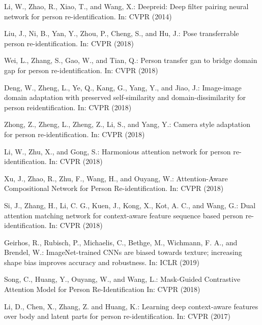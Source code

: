 \documentclass[10pt,twocolumn,letterpaper]{article}
\begin{document}
\begin{thebibliography}{8}

Li, W., Zhao, R., Xiao, T., and Wang, X.:
\newblock Deepreid: Deep filter pairing neural network for person re-identification.
\newblock In: CVPR (2014)

\newblock Liu, J., Ni, B., Yan, Y., Zhou, P., Cheng, S., and Hu, J.:
\newblock Pose transferrable person re-identification.
\newblock In: CVPR (2018)

\newblock Wei, L., Zhang, S., Gao, W., and Tian, Q.:
\newblock Person transfer gan to bridge domain gap for person re-identification.
\newblock In: CVPR (2018)

\newblock Deng, W., Zheng, L., Ye, Q., Kang, G., Yang, Y., and Jiao, J.:
\newblock Image-image domain adaptation with preserved self-similarity and domain-dissimilarity for person reidentification.
\newblock  In: CVPR (2018)

\newblock Zhong, Z., Zheng, L., Zheng, Z., Li, S., and Yang, Y.:
\newblock Camera style adaptation for person re-identification.
\newblock  In: CVPR (2018)


\newblock Li, W., Zhu, X., and Gong, S.:
\newblock Harmonious attention network for person re-identification.
\newblock In: CVPR (2018)

\newblock Xu, J., Zhao, R., Zhu, F., Wang, H., and Ouyang, W.:
\newblock Attention-Aware Compositional Network for Person Re-identification.
\newblock In: CVPR (2018)

\newblock Si, J., Zhang, H., Li, C. G., Kuen, J., Kong, X., Kot, A. C., and Wang, G.:
\newblock Dual attention matching network for context-aware feature sequence based person re-identification.
\newblock In: CVPR (2018)

\newblock Geirhos, R., Rubisch, P., Michaelis, C., Bethge, M., Wichmann, F. A., and Brendel, W.:
\newblock ImageNet-trained CNNs are biased towards texture; increasing shape bias improves accuracy and robustness.
\newblock In: ICLR (2019)


\newblock Song, C., Huang, Y., Ouyang, W., and Wang, L.:
\newblock Mask-Guided Contrastive Attention Model for Person Re-Identification
\newblock In: CVPR (2018)


\newblock Li, D., Chen, X., Zhang, Z. and Huang, K.:
\newblock Learning deep context-aware features over body and latent parts for person re-identification.
\newblock In: CVPR (2017)



\end{thebibliography}
\end{document}

